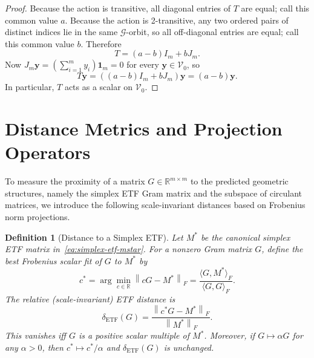 \documentclass[11pt]{article}
\newtheorem{definition}{Definition}
\begin{document}
\begin{proof}
Because the action is transitive, all diagonal entries of \(T\) are equal; call
this common value \(a\). Because the action is 2-transitive, any two ordered
pairs of distinct indices lie in the same \(\mathcal G\)-orbit, so all off-diagonal
entries are equal; call this common value \(b\). Therefore
\[
T=(a-b)I_m+bJ_m.
\]
Now \(J_m\boldsymbol{y}=(\sum_{i=1}^m y_i)\boldsymbol{1}_m=0\) for every
\(\boldsymbol{y}\in \mathcal V_0\), so
\[
T\boldsymbol{y}=((a-b)I_m+bJ_m)\boldsymbol{y}=(a-b)\boldsymbol{y}.
\]
In particular, \(T\) acts as a scalar on \(\mathcal V_0\).
\end{proof}

\section{Distance Metrics and Projection Operators}
\label{app:measure}

To measure the proximity of a matrix \(G\in\mathbb{R}^{m\times m}\) to the predicted geometric structures, namely the simplex ETF Gram matrix and the subspace of circulant matrices, we introduce the following scale-invariant distances based on Frobenius norm projections.

\begin{definition}[Distance to a Simplex ETF]
\label{def:dis_etf}
Let \(M^*\) be the canonical simplex ETF matrix in~\cref{eq:simplex-etf-mstar}. For a nonzero Gram matrix \(G\), define the best Frobenius scalar fit of \(G\) to \(M^*\) by
\[
c^*  =  \arg\min_{c\in\mathbb{R}}   \left\| cG - M^* \right\|_F
=  \frac{\langle G, M^*\rangle_F}{\langle G, G\rangle_F}.
\]
The relative (scale-invariant) ETF distance is
\[
\delta_{\mathrm{ETF}}(G)  =  \frac{\left\| c^* G - M^* \right\|_F}{\left\| M^* \right\|_F}.
\]
This vanishes iff \(G\) is a positive scalar multiple of \(M^*\). Moreover, if \(G\mapsto \alpha G\) for any \(\alpha>0\), then \(c^*\mapsto c^*/\alpha\) and \(\delta_{\mathrm{ETF}}(G)\) is unchanged.
\end{definition}
\end{document}
